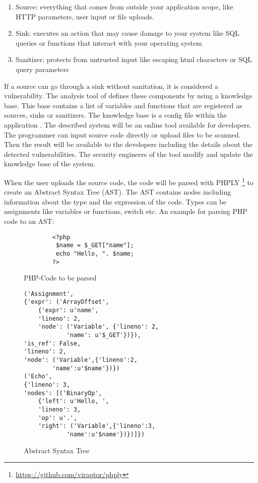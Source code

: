 \begin{enumerate}
    \item Source: everything that comes from outside your application scope, like HTTP parameters, user input or file uploads.
    \item Sink: executes an action that may cause damage to your system like SQL queries or functions that interact with your operating system
    \item Sanitizer: protects from untrusted input like escaping html characters or SQL query parameters
\end{enumerate}

If a source can go through a sink without sanitation, it is considered a vulnerability. The analysis tool of \textcite[]{Maskur2019} defines these components by using a knowledge base. This base contains a list of variables and functions that are registered as sources, sinks or sanitizers. The knowledge base is a config file within the application \autocite[3]{Maskur2019}. The described system will be an online tool available for developers. The programmer can input source code directly or upload files to be scanned. Then the result will be available to the developers including the details about the detected vulnerabilities. The security engineers of the tool modify and update the knowledge base of the system.\newline

When the user uploads the source code, the code will be parsed with PHPLY \footnote{ \url{https://github.com/viraptor/phply}} to create an Abstract Syntax Tree (AST). The AST contains nodes including information about the type and the expression of the code. Types can be assignments like variables or functions, switch etc. An example for parsing PHP code to an AST:

\begin{figure}[H]
\begin{verbatim}
        <?php
         $name = $_GET["name"];
         echo "Hello, ". $name;
        ?>  
\end{verbatim}
    \caption{PHP-Code to be parsed}
    \label{PHP}
\end{figure}

\begin{figure}[H]
\begin{verbatim}
('Assignment', 
{'expr': ('ArrayOffset',
    {'expr': u'name', 
    'lineno': 2, 
    'node': ('Variable', {'lineno': 2,
            'name': u'$_GET'})}),
'is_ref': False, 
'lineno': 2, 
'node': ('Variable',{'lineno':2,
        'name':u'$name'})}) 
('Echo',
{'lineno': 3, 
'nodes': [('BinaryOp',
    {'left': u'Hello, ', 
    'lineno': 3,
    'op': u'.', 
    'right': ('Variable',{'lineno':3,
            'name':u'$name'})})]})
\end{verbatim}
    \caption{Abstract Syntax Tree}
    \label{AST}
\end{figure}

